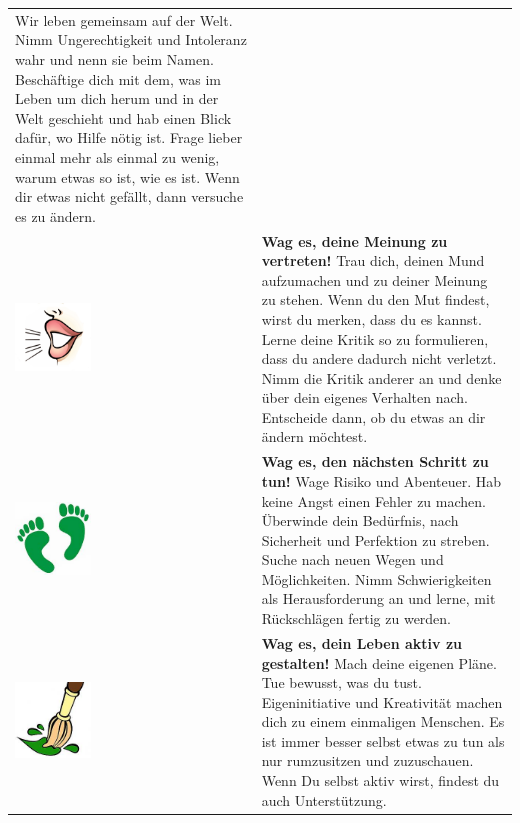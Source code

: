 \begin{tabular}{m{2cm}m{10cm}}
	Wir leben gemeinsam auf der Welt. Nimm Ungerechtigkeit und Intoleranz wahr und nenn sie beim Namen. Beschäftige dich mit dem, was im Leben um dich herum und in der Welt geschieht und hab einen Blick dafür, wo Hilfe nötig ist. Frage lieber einmal mehr als einmal zu wenig, warum etwas so ist, wie es ist. Wenn dir etwas nicht gefällt, dann versuche es zu ändern. \\
	\includegraphics[width=2cm]{Ausgaben/Sola24/Grafiken/Meinung.jpg} & \textbf{Wag es, deine Meinung zu vertreten!} \newline
	Trau dich, deinen Mund aufzumachen und zu deiner Meinung zu stehen. Wenn du den Mut findest, wirst du merken, dass du es kannst. Lerne deine Kritik so zu formulieren, dass du andere dadurch nicht verletzt. Nimm die Kritik anderer an und denke über dein eigenes Verhalten nach. Entscheide dann, ob du etwas an dir ändern möchtest. \\
	\includegraphics[width=2cm]{Ausgaben/Sola24/Grafiken/steps.jpg} & \textbf{Wag es, den nächsten Schritt zu tun!} \newline
	Wage Risiko und Abenteuer. Hab keine Angst einen Fehler zu machen. Überwinde dein Bedürfnis, nach Sicherheit und Perfektion zu streben. Suche nach neuen Wegen und Möglichkeiten. Nimm Schwierigkeiten als Herausforderung an und lerne, mit Rückschlägen fertig zu werden. \\
	\includegraphics[width=2cm]{Ausgaben/Sola24/Grafiken/brush.jpg} & \textbf{Wag es, dein Leben aktiv zu gestalten!} \newline
	Mach deine eigenen Pläne. Tue bewusst, was du tust. Eigeninitiative und Kreativität machen dich zu einem einmaligen Menschen. Es ist immer besser selbst etwas zu tun als nur rumzusitzen und zuzuschauen. Wenn Du selbst aktiv wirst, findest du auch Unterstützung. \\

\end{tabular}

